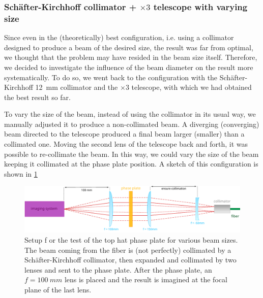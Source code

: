 \subsubsection{Schäfter-Kirchhoff collimator + $\times 3$ telescope with varying size}

Since even in the (theoretically) best configuration, i.e. using a collimator designed to produce a beam of the desired size, the result was far from optimal, we thought that the problem may have resided in the beam size itself. Therefore, we decided to investigate the influence of the beam diameter on the result more systematically. To do so, we went back to the configuration with the Schäfter-Kirchhoff \SI{12}{mm} collimator and the $\times3$ telescope, with which we had obtained the best result so far.

To vary the size of the beam, instead of using the collimator in its usual way, we manually adjusted it to produce a non-collimated beam. A diverging (converging) beam directed to the telescope produced a final beam larger (smaller) than a collimated one. Moving the second lens of the telescope back and forth, it was possible to re-collimate the beam. In this way, we could vary the size of the beam keeping it collimated at the phase plate  position. A sketch of this configuration is shown in \cref{fig:adjustable_setup}

\begin{figure}
    \includegraphics[width=\textwidth]{chapters/chapter_3/figures/adjfoc_setup.pdf}
    \caption{Setup f    or the test of the top hat phase plate for various beam sizes. The beam coming from the fiber is (not perfectly) collimated by a Schäfter-Kirchhoff collimator, then expanded and collimated by two lenses and sent to the phase plate. After the phase plate, an $f=\SI{100}{mm}$ lens is placed and the result is imagined at the focal plane of the last lens.}
    \label{fig:adjustable_setup}
\end{figure}

